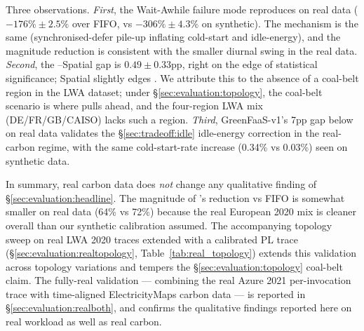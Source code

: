 Three observations. \emph{First}, the Wait-Awhile failure mode
reproduces on real data ($-176\% \pm 2.5\%$ over FIFO, vs
$-306\% \pm 4.3\%$ on synthetic). The mechanism is the same
(synchronised-defer pile-up inflating cold-start and idle-energy),
and the magnitude reduction is consistent with the smaller diurnal
swing in the real data.
\emph{Second}, the \GreenFaaS--Spatial gap is $0.49 \pm 0.33$pp,
right on the edge of statistical significance; Spatial slightly edges
\GreenFaaS{}. We attribute this to the absence of a coal-belt region
in the LWA dataset;
under \S\ref{sec:evaluation:topology}, the coal-belt scenario is where
\GreenFaaS{} pulls ahead, and the four-region LWA mix (DE/FR/GB/CAISO)
lacks such a region. \emph{Third}, GreenFaaS-v1's 7pp gap below
\GreenFaaS{} on real data validates the
\S\ref{sec:tradeoff:idle} idle-energy correction in the real-carbon
regime, with the same cold-start-rate increase (0.34\% vs 0.03\%)
seen on synthetic data.

In summary, real carbon data does \emph{not} change any
qualitative finding of \S\ref{sec:evaluation:headline}. The magnitude
of \GreenFaaS's reduction vs FIFO is somewhat smaller on real data
(64\% vs 72\%) because the real European 2020 mix is cleaner overall
than our synthetic calibration assumed. The accompanying topology
sweep on real LWA 2020 traces extended with a calibrated PL trace
(\S\ref{sec:evaluation:realtopology}, Table~\ref{tab:real_topology})
extends this validation across topology variations and tempers the
\S\ref{sec:evaluation:topology} coal-belt claim. The fully-real
validation --- combining the real Azure 2021 per-invocation trace
with time-aligned ElectricityMaps carbon data --- is reported in
\S\ref{sec:evaluation:realboth}, and confirms the qualitative
findings reported here on real workload as well as real carbon.
